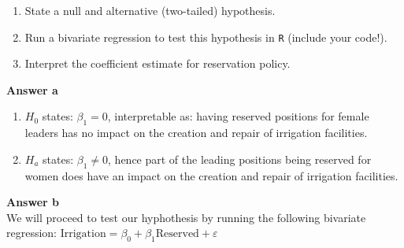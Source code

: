 \documentclass[12pt,letterpaper]{article}
\begin{document}
\newpage
\begin{enumerate}
	\item [(a)] State a null and alternative (two-tailed) hypothesis. 
	
	\vspace{1cm}
	\item [(b)] Run a bivariate regression to test this hypothesis in \texttt{R} (include your code!).
	
	\vspace{1cm}
	\item [(c)] Interpret the coefficient estimate for reservation policy. 
\end{enumerate}

\vspace{2cm}
\noindent\textbf{Answer a}\\
\vspace{0.5cm}
\begin{enumerate}
	\item $H_0$ states: $\beta_1 = 0$, interpretable as: having reserved positions for female leaders has no impact on the creation and repair of irrigation facilities. \\
	\item $H_a$ states: $\beta_1 \neq 0$, hence part of the leading positions being reserved for women does have an impact on the creation and repair of irrigation facilities. \\
\end{enumerate}

\vspace{0.5cm}
\noindent\textbf{Answer b}\\
\vspace{0.5cm}
\noindent We will proceed to test our hyphothesis by running the following bivariate regression: 
\noindent $\text{Irrigation} = \beta_0 + \beta_1 \text{Reserved} + \varepsilon$
\vspace{0.5cm}
\end{document}
